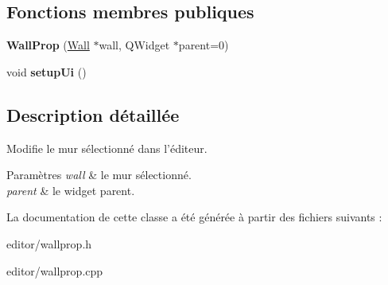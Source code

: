 \subsection*{Fonctions membres publiques}
\begin{DoxyCompactItemize}
\item 
\hypertarget{classWallProp_adb6bbb2ab2fbbb9a8e15a3f38b421595}{{\bfseries Wall\+Prop} (\hyperlink{classWall}{Wall} $\ast$wall, Q\+Widget $\ast$parent=0)}\label{classWallProp_adb6bbb2ab2fbbb9a8e15a3f38b421595}

\item 
\hypertarget{classWallProp_ad6a83260d08c321f8283d29505504c7f}{void {\bfseries setup\+Ui} ()}\label{classWallProp_ad6a83260d08c321f8283d29505504c7f}

\end{DoxyCompactItemize}


\subsection{Description détaillée}
Modifie le mur sélectionné dans l’éditeur. 


\begin{DoxyParams}{Paramètres}
{\em wall} & le mur sélectionné. \\
\hline
{\em parent} & le widget parent. \\
\hline
\end{DoxyParams}


La documentation de cette classe a été générée à partir des fichiers suivants \+:\begin{DoxyCompactItemize}
\item 
editor/wallprop.\+h\item 
editor/wallprop.\+cpp\end{DoxyCompactItemize}

